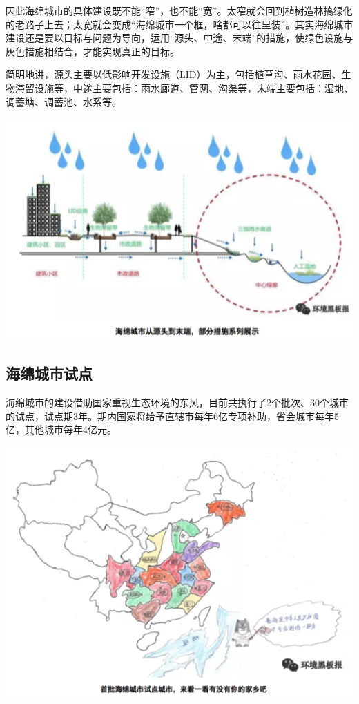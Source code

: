 \documentclass[]{book}
\begin{document}
因此海绵城市的具体建设既不能``窄''，也不能``宽''。太窄就会回到植树造林搞绿化的老路子上去；太宽就会变成``海绵城市一个框，啥都可以往里装''。其实海绵城市建设还是要以目标与问题为导向，运用``源头、中途、末端''的措施，使绿色设施与灰色措施相结合，才能实现真正的目标。

简明地讲，源头主要以低影响开发设施（LID）为主，包括植草沟、雨水花园、生物滞留设施等，中途主要包括：雨水廊道、管网、沟渠等，末端主要包括：湿地、调蓄塘、调蓄池、水系等。

\includegraphics[width=6.67in]{images/ch4}

\subsection{海绵城市试点}

海绵城市的建设借助国家重视生态环境的东风，目前共执行了2个批次、30个城市的试点，试点期3年。期内国家将给予直辖市每年6亿专项补助，省会城市每年5亿，其他城市每年4亿元。

\includegraphics[width=6.67in]{images/ch5}
\end{document}
